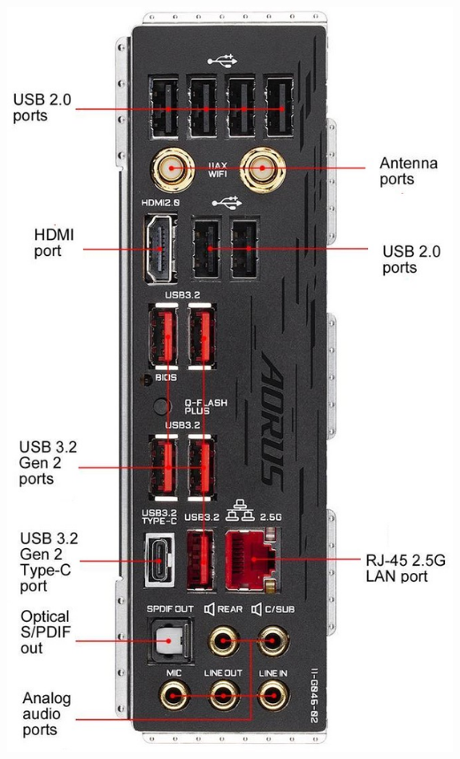 \documentclass{article}
\begin{document}
\begin{itemize}
\begin{minipage}{\textwidth}
      \includegraphics[scale=0.4]{img/frontal_vertical.jpg}
    \end{minipage}
  \end{itemize}
\end{document}

